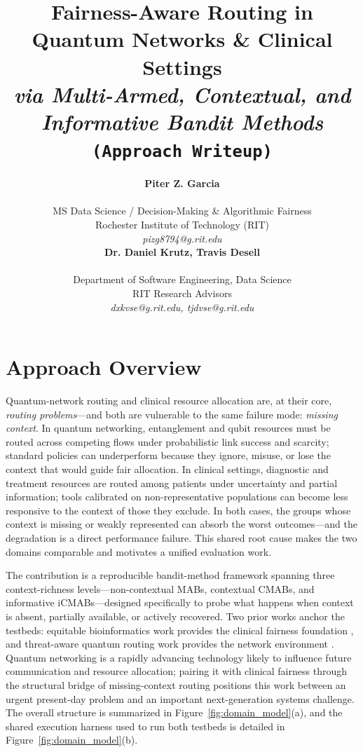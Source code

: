 \documentclass{IEEEtran}
\title{{\LARGE\textbf{Fairness-Aware Routing in Quantum Networks \& Clinical Settings}}\\
{\Large\textit{via Multi-Armed, Contextual, and Informative Bandit Methods}}\\
{\large\texttt{(Approach Writeup)}}}
\author{%
\begin{minipage}{0.48\textwidth}
\begin{center}
{\bf Piter Z. Garcia}\\
\begin{small}
MS Data Science / Decision-Making \& Algorithmic Fairness\\
Rochester Institute of Technology (RIT)\\
{\it pizg8794@g.rit.edu}
\end{small}
\end{center}
\end{minipage}
\hfill
\begin{minipage}{0.48\textwidth}
\begin{center}
{\bf Dr. Daniel Krutz, Travis Desell}\\
\begin{small}
Department of Software Engineering, Data Science\\
RIT Research Advisors\\
{\it dxkvse@g.rit.edu, tjdvse@g.rit.edu}
\end{small}
\end{center}
\end{minipage}%
}
\begin{document}
\maketitle

\section{Approach Overview}

Quantum-network routing and clinical resource allocation are, at their
core, \textit{routing problems}---and both are vulnerable to the same failure
mode: \textit{missing context}. In quantum networking, entanglement and qubit
resources must be routed across competing flows under probabilistic link
success and scarcity; standard policies can underperform because they ignore,
misuse, or lose the context that would guide fair allocation. In clinical
settings, diagnostic and treatment resources are routed among patients under
uncertainty and partial information; tools calibrated on non-representative
populations can become less responsive to the context of those they exclude.
In both cases, the groups whose context is missing or weakly represented can
absorb the worst outcomes---and the degradation is a direct performance failure. 
This shared root cause makes the two domains comparable and 
motivates a unified evaluation work.

The contribution is a reproducible bandit-method framework spanning three
context-richness levels---non-contextual MABs, contextual CMABs, and
informative iCMABs---designed specifically to probe what happens when context
is absent, partially available, or actively recovered. Two prior works anchor
the testbeds: equitable bioinformatics work provides the clinical fairness
foundation \cite{garcia2025equitable_bioinformatics}, and threat-aware
quantum routing work provides the network environment
\cite{garcia2026threat_aware_quantum_routing}. Quantum networking is a rapidly
advancing technology likely to influence future communication and resource
allocation; pairing it with clinical fairness through the structural bridge
of missing-context routing positions this work between an urgent present-day
problem and an important next-generation systems challenge. The overall
structure is summarized in Figure~\ref{fig:domain_model}(a), and the shared
execution harness used to run both testbeds is detailed in
Figure~\ref{fig:domain_model}(b).
\end{document}
